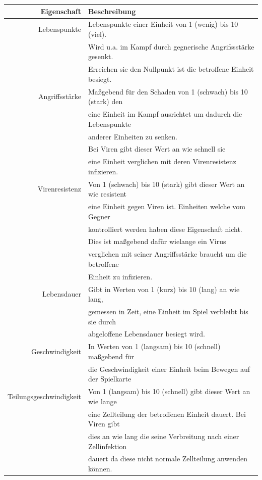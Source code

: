 \documentclass[11pt]{article}
\begin{document}
\begin{tabular}{|r|l|}
\hline
Eigenschaft		& Beschreibung\\\hline\hline
Lebenspunkte	& Lebenspunkte einer Einheit von 1 (wenig) bis 10 (viel).\\
			& Wird u.a. im Kampf durch gegnerische Angrifssst\"arke gesenkt.\\
			& Erreichen sie den Nullpunkt ist die betroffene Einheit besiegt.\\\hline
Angriffsst\"arke	& Maßgebend f\"ur den Schaden von 1 (schwach) bis 10 (stark) den\\
			& eine Einheit im Kampf ausrichtet um dadurch die Lebenspunkte\\
			& anderer Einheiten zu senken.\\
			& Bei Viren gibt dieser Wert an wie schnell sie\\
			& eine Einheit verglichen mit deren Virenresistenz infizieren.\\\hline
Virenresistenz	& Von 1 (schwach) bis 10 (stark) gibt dieser Wert an wie resistent\\
			& eine Einheit gegen Viren ist. Einheiten welche vom Gegner\\
			& kontrolliert werden haben diese Eigenschaft nicht.\\
			& Dies ist maßgebend daf\"ur wielange ein Virus\\
			& verglichen mit seiner Angriffsst\"arke braucht um die betroffene\\
			& Einheit zu infizieren.\\\hline
Lebensdauer		& Gibt in Werten von 1 (kurz) bis 10 (lang) an wie lang,\\
			& gemessen in Zeit, eine Einheit im Spiel verbleibt bis sie durch\\
			& abgeloffene Lebensdauer besiegt wird.\\\hline
Geschwindigkeit	& In Werten von 1 (langsam) bis 10 (schnell) maßgebend f\"ur\\
			& die Geschwindigkeit einer Einheit beim Bewegen auf der Spielkarte\\\hline
Teilungsgeschwindigkeit	& Von 1 (langsam) bis 10 (schnell) gibt dieser Wert an wie lange\\
			& eine Zellteilung der betroffenen Einheit dauert. Bei Viren gibt\\
			& dies an wie lang die seine Verbreitung nach einer Zellinfektion\\
			& dauert da diese nicht normale Zellteilung anwenden k\"onnen.\\\hline

\end{tabular}
\end{document}
